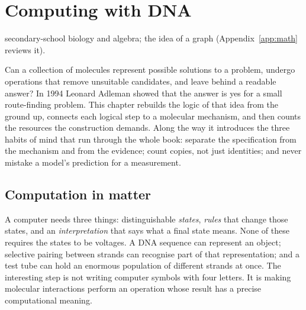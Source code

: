 \chapter{Computing with DNA}\label{ch:computing}
{secondary-school biology and algebra; the idea of a graph (Appendix~\ref{app:math} reviews it).}

Can a collection of molecules represent possible solutions to a problem,
undergo operations that remove unsuitable candidates, and leave behind a
readable answer? In 1994 Leonard Adleman showed that the answer is yes for a
small route-finding problem.\cite{Adleman1994} This chapter rebuilds the logic
of that idea from the ground up, connects each logical step to a molecular
mechanism, and then counts the resources the construction demands. Along the
way it introduces the three habits of mind that run through the whole book:
separate the specification from the mechanism and from the evidence; count
copies, not just identities; and never mistake a model's prediction for a
measurement.

\section{Computation in matter}\label{sec:matter}
A computer needs three things: distinguishable \emph{states}, \emph{rules} that
change those states, and an \emph{interpretation} that says what a final state
means. None of these requires the states to be voltages. A DNA sequence can
represent an object; selective pairing between strands can recognise part of
that representation; and a test tube can hold an enormous population of
different strands at once. The interesting step is not writing computer symbols
with four letters. It is making molecular interactions perform an operation
whose result has a precise computational meaning.

